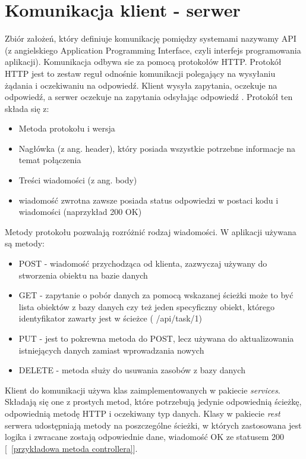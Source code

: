 \section{Komunikacja klient - serwer}
Zbiór założeń, który definiuje komunikację pomiędzy systemami nazywamy API (z angielskiego Application Programming Interface, czyli interfejs programowania aplikacji).  Komunikacja odbywa sie za pomocą protokołów HTTP. Protokół HTTP jest to zestaw reguł odnośnie komunikacji polegający na wysyłaniu żądania i oczekiwaniu na odpowiedź. Klient wysyła zapytania, oczekuje na odpowiedź, a serwer oczekuje na zapytania odsyłając odpowiedź \cite{rfc7230}.
\newline
Protokół ten składa się z:
\begin{itemize}
	\item Metoda protokołu i wersja
	\item Nagłówka (z ang. header), który posiada wszystkie potrzebne informacje na temat połączenia
	\item Treści wiadomości (z ang. body)
	\item wiadomość zwrotna zawsze posiada status odpowiedzi w postaci kodu i wiadomości (naprzykład 200 OK)
\end{itemize}
Metody protokołu pozwalają rozróżnić rodzaj wiadomości. W aplikacji używana są metody:
\begin{itemize}
	\item POST  - wiadomość przychodząca od klienta, zazwyczaj używany do stworzenia obiektu na bazie danych
	\item GET - zapytanie o pobór danych za pomocą wskazanej ścieżki
	może to być lista obiektów z bazy danych czy też jeden specyficzny obiekt, którego identyfikator zawarty jest w ścieżce ( /api/task/1)
	\item PUT - jest to pokrewna metoda do POST, lecz używana do aktualizowania istniejących danych zamiast wprowadzania nowych
	\item DELETE - metoda służy do usuwania zasobów z bazy danych
\end{itemize}
Klient do komunikacji używa klas zaimplementowanych w pakiecie \textit{services}. Składają się one z prostych metod, które potrzebują jedynie odpowiednią ścieżkę, odpowiednią metodę HTTP i oczekiwany typ danych.
Klasy w pakiecie \textit{rest} serwera udostępniają metody na poszczególne ścieżki, w których zastosowana jest logika i zwracane zostają odpowiednie dane, wiadomość OK ze statusem 200 [~\ref{przykładowa metoda controllera}].

